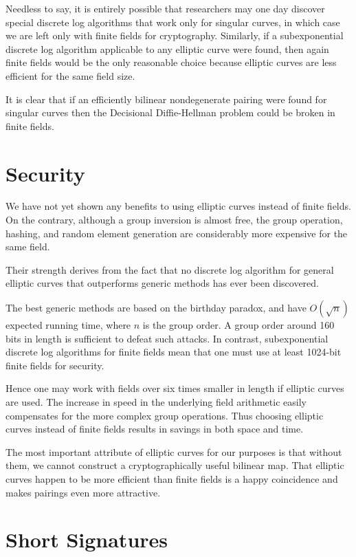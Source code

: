 Needless to say, it is entirely possible that researchers may
one day discover special discrete log algorithms that work only for
singular curves, in which case we are left only with finite fields for
cryptography. Similarly, if a subexponential discrete log algorithm applicable
to any elliptic curve were found, then again finite fields would be the only
reasonable choice because elliptic curves are less efficient for the same
field size.

It is clear that if an efficiently bilinear nondegenerate pairing were found
for singular curves then the Decisional Diffie-Hellman problem could be broken
in finite fields.

\section {\label{sec:eccsec}Security}

We have not yet shown any benefits to using elliptic curves instead
of finite fields. On the contrary, although a group inversion is
almost free, the group operation, hashing, and random element generation
are considerably more expensive for the same field.

Their strength derives from the fact that no discrete log algorithm for
general elliptic curves that outperforms generic methods has ever been
discovered.

The best generic methods are based on the birthday paradox, and have
$O(\sqrt{n})$ expected running time, where $n$ is the group order.
A group order around 160 bits in length is sufficient to defeat such attacks.
In contrast, subexponential discrete log algorithms for finite fields
mean that one must use at least 1024-bit finite fields for security.

Hence one may work with fields over six times smaller in length
if elliptic curves are used. The increase in speed in
the underlying field arithmetic easily compensates for the more
complex group operations. Thus choosing elliptic curves instead of
finite fields results in savings in both space and time.

The most important attribute of elliptic curves for our purposes
is that without them, we cannot construct a cryptographically
useful bilinear map. That elliptic curves happen to be more
efficient than finite fields
is a happy coincidence and makes pairings even more attractive.

\section {Short Signatures}

